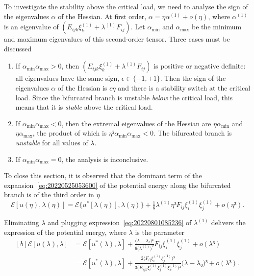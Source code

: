 \documentclass[12pt, final]{scrartcl}
\theoremstyle{definition}
\newcommand{\E}{\mathcal E}
\newcommand{\order}[2][1]{#2^{(#1)}}
\begin{document}
\begin{center}
\end{center}

To investigate the stability above the critical load, we need to analyse the
sign of the eigenvalues $α$ of the Hessian. At first order,
$α = η \order[1]α + o(η)$, where $\order[1]α$ is an eigenvalue of
$(E_{ijk} \order[1]{ξ_k} + \order[1]\lambda F_{ij})$. Let $α_{\min}$ and $α_{\max}$ be the minimum
and maximum eigenvalues of this second-order tensor. Three cases must be
discussed
\begin{enumerate}
\item If $α_{\min} α_{\max} > 0$, then $(E_{ijk} \order[1]{ξ_k} + \order[1]\lambda F_{ij})$ is
  positive or negative definite: all eigenvalues have the same sign,
  $\epsilon \in \{-1, +1\}$. Then the sign of the eigenvalues $α$ of the
  Hessian is $\epsilon η$ and there is a stability switch at the critical
  load. Since the bifurcated branch is unstable \emph{below} the critical load,
  this means that it is \emph{stable} above the critical load.
\item If $α_{\min} α_{\max} < 0$, then the extremal eigenvalues of the Hessian
  are $η α_{\min}$ and $η α_{\max}$, the product of which is
  $η² α_{\min} α_{\max} < 0$. The bifurcated branch is \emph{unstable} for all
  values of $\lambda$.
\item If $α_{\min} α_{\max} = 0$, the analysis is inconclusive.
\end{enumerate}

To close this section, it is observed that the dominant term of the
expansion~\eqref{eq:20220525053600} of the potential energy along the bifurcated
branch is of the third order in $η$
\begin{equation}
  \E[u(η), \lambda(η)] = \E\{u^{\ast}[\lambda(η)], \lambda(η)\} + \tfrac{1}{6} \order[1]\lambda η³ F_{i j} \order[1]{ξ_i} \order[1]{ξ_j} + o(η³).
\end{equation}

Eliminating $\lambda$ and plugging expression~\eqref{eq:20220801085236} of $\order[1]\lambda$
delivers the expression of the potential energy, where $\lambda$ is the parameter
\begin{equation}
  \begin{aligned}[b]
    \E[u(\lambda), \lambda] &= \E[u^{\ast}(\lambda), \lambda] + \frac{\bigl(\lambda - \lambda₀\bigr)³}{6\bigl( \order[1]\lambda \bigr)^2} F_{i j} \order[1]{ξ_i} \order[1]{ξ_j} + o(\lambda³)\\
    &= \E[u^{\ast}(\lambda), \lambda] + \frac{2 \bigl( F_{i j} \order[1]{ξ_i} \order[1]{ξ_j} \bigr)³}{3 \bigl( E_{ijk} \order[1]{ξ_i} \order[1]{ξ_j} \order[1]{ξ_k} \bigr)²} \bigl(\lambda - \lambda₀\bigr)³ + o(\lambda³).
  \end{aligned}
\end{equation}
\end{document}
